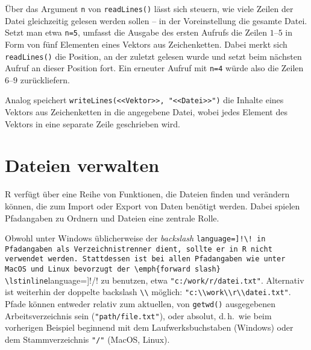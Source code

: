 Über das Argument \lstinline!n! von \lstinline!readLines()! lässt sich steuern, wie viele Zeilen der Datei gleichzeitig gelesen werden sollen -- in der Voreinstellung die gesamte Datei. Setzt man etwa \lstinline!n=5!, umfasst die Ausgabe des ersten Aufrufs die Zeilen $1$--$5$ in Form von fünf Elementen eines Vektors aus Zeichenketten. Dabei merkt sich \lstinline!readLines()! die Position, an der zuletzt gelesen wurde und setzt beim nächsten Aufruf an dieser Position fort. Ein erneuter Aufruf mit \lstinline!n=4! würde also die Zeilen $6$--$9$ zurückliefern.

Analog speichert \lstinline!writeLines(<<Vektor>>, "<<Datei>>")! die Inhalte eines Vektors aus Zeichenketten in die angegebene Datei, wobei jedes Element des Vektors in eine separate Zeile geschrieben wird.

\section{Dateien verwalten}
\label{sec:files}

R verfügt über eine Reihe von Funktionen, die Dateien finden und verändern können, die zum Import oder Export von Daten benötigt werden. Dabei spielen Pfadangaben zu Ordnern und Dateien eine zentrale Rolle.

Obwohl unter Windows üblicherweise der \emph{backslash} \lstinline[language=]!\! in Pfadangaben als Verzeichnistrenner dient, sollte er in R nicht verwendet werden. Stattdessen ist bei allen Pfadangaben wie unter MacOS und Linux bevorzugt der \emph{forward slash} \lstinline[language=]!/! zu benutzen, etwa \lstinline!"c:/work/r/datei.txt"!. Alternativ ist weiterhin der doppelte backslash \lstinline!\\! möglich: \lstinline!"c:\\work\\r\\datei.txt"!. Pfade können entweder relativ zum aktuellen, von \lstinline!getwd()! ausgegebenen Arbeitsverzeichnis sein (\lstinline!"path/file.txt"!), oder absolut, d.\,h.\ wie beim vorherigen Beispiel beginnend mit dem Laufwerksbuchstaben (Windows) oder dem Stammverzeichnis \lstinline!"/"! (MacOS, Linux).

